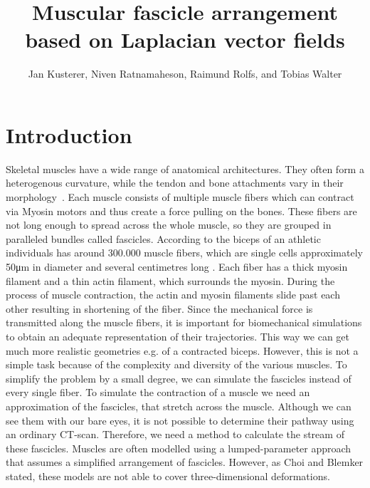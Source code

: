 \documentclass[preprint,journal]{vgtc}       %
\title{Muscular fascicle arrangement based on Laplacian vector fields}
\author{Jan Kusterer, Niven Ratnamaheson, Raimund Rolfs, and Tobias Walter}
\begin{document}
\maketitle

\section{Introduction}\label{sec:intro}
Skeletal muscles have a wide range of anatomical architectures. They often form a heterogenous curvature, while the tendon and bone attachments vary in their morphology~\cite{Choi2013}. Each muscle consists of multiple muscle fibers which can contract via Myosin motors \cite{Jiangcheng2015} and thus create a force pulling on the bones. These fibers are not long enough to spread across the whole muscle, so they are grouped in paralleled bundles called fascicles. 
According to \cite{Etemadi.et.Al.} the biceps of an athletic individuals has around 300.000 muscle fibers, which are single cells approximately 50μm in diameter and several centimetres long \cite{Cooper2000}. Each fiber has a thick myosin filament and a thin actin filament, which surrounds the myosin. During the process of muscle contraction, the actin and myosin filaments slide past each other resulting in shortening of the fiber.
Since the mechanical force is transmitted along the muscle fibers, it is important for biomechanical simulations to obtain an adequate representation of their trajectories. This way we can get much more realistic geometries e.g. of a contracted biceps. However, this is not a simple task because of the complexity and diversity of the various muscles. To simplify the problem by a small degree, we can simulate the fascicles instead of every single fiber.
To simulate the contraction of a muscle we need an approximation of the fascicles, that stretch across the muscle. Although we can see them with our bare eyes, it is not possible to determine their pathway using an ordinary CT-scan. 
Therefore, we need a method to calculate the stream of these fascicles. Muscles are often modelled using a lumped-parameter approach that assumes a simplified arrangement of fascicles. However, as Choi and Blemker stated, these models are not able to cover three-dimensional deformations.
\end{document}
